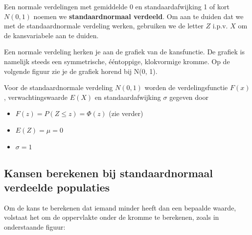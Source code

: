 \documentclass[12pt,twoside,a4paper]{article}
\begin{document}
Een normale verdelingen met gemiddelde 0 en standaardafwijking 1 of kort $N(0,1)$ noemen we {\bf standaardnormaal verdeeld}. Om aan te duiden dat we met de standaardnormale verdeling werken, gebruiken we de letter $Z$ i.p.v. $X$ om de kansvariabele aan te duiden.

Een normale verdeling herken je aan de grafiek van de kansfunctie. De grafiek is namelijk steeds een symmetrische, ééntoppige, klokvormige kromme. Op de volgende figuur zie je de grafiek horend bij N(0, 1).

\begin{center}
\end{center}

Voor de standaardnormale verdeling $N(0,1)$ worden de verdelingsfunctie $F(x)$, verwachtingswaarde $E(X)$ en standaardafwijking $\sigma$ gegeven door
\begin{itemize}
  \item $F(z)=P(Z\leq z)=\Phi(z)$ (zie verder)
  \item $E(Z)=\mu=0$
  \item $\sigma=1$
\end{itemize}

\subsection{Kansen berekenen bij standaardnormaal verdeelde populaties}

Om de kans te berekenen dat iemand minder heeft dan een bepaalde waarde, volstaat het om de oppervlakte onder de kromme te berekenen, zoals in onderstaande figuur:
\end{document}
